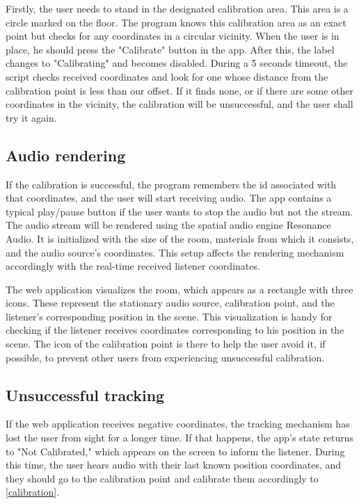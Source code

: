 \documentclass{ctuthesis}
\begin{document}
Firstly, the user needs to stand in the designated calibration area. This area is a circle marked on the floor. The program knows this calibration area as an exact point but checks for any coordinates in a circular vicinity. When the user is in place, he should press the "Calibrate" button in the app. After this, the label changes to "Calibrating" and becomes disabled. During a 5 seconds timeout, the script checks received coordinates and look for one whose distance from the calibration point is less than our offset. If it finds none, or if there are some other coordinates in the vicinity, the calibration will be unsuccessful, and the user shall try it again.

\subsection{Audio rendering}
If the calibration is successful, the program remembers the id associated with that coordinates, and the user will start receiving audio. The app contains a typical play/pause button if the user wants to stop the audio but not the stream. The audio stream will be rendered using the spatial audio engine Resonance Audio. It is initialized with the size of the room, materials from which it consists, and the audio source's coordinates. This setup affects the rendering mechanism accordingly with the real-time received listener coordinates. 

The web application visualizes the room, which appears as a rectangle with three icons. These represent the stationary audio source, calibration point, and the listener's corresponding position in the scene. This visualization is handy for checking if the listener receives coordinates corresponding to his position in the scene. The icon of the calibration point is there to help the user avoid it, if possible, to prevent other users from experiencing unsuccessful calibration.

\subsection{Unsuccessful tracking}
If the web application receives negative coordinates, the tracking mechanism has lost the user from sight for a longer time. If that happens, the app's state returns to "Not Calibrated," which appears on the screen to inform the listener. During this time, the user hears audio with their last known position coordinates, and they should go to the calibration point and calibrate them accordingly to \ref{calibration}.
\end{document}
